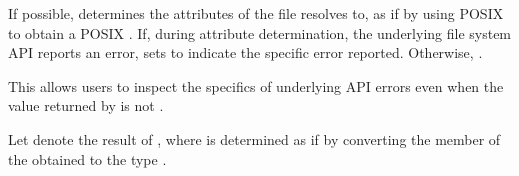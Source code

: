 \begin{itemdescr}
\pnum
\effects
If possible, determines the attributes
    of the file  resolves to, as if by using POSIX 
    to obtain a POSIX .
      If, during attribute determination, the underlying file system API reports
    an error, sets  to indicate the specific error reported.
    Otherwise, .
\begin{note}
This allows users to inspect the specifics of underlying
      API errors even when the value returned by  is not
      .
\end{note}

\pnum
Let  denote the result of ,
where  is determined as if by converting the  member
of the obtained  to the type .


\end{itemdescr}
